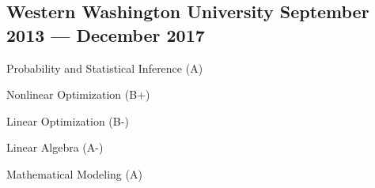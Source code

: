 \documentclass[letter,10pt]{article}
\begin{document}
\subsection{{Western Washington University \hfill September 2013 --- December 2017}}
\begin{zitemize}
    \item Probability and Statistical Inference (A)
    \item Nonlinear Optimization (B+)
    \item Linear Optimization (B-)
    \item Linear Algebra (A-)
    \item Mathematical Modeling (A)
\end{zitemize}
\end{document}
